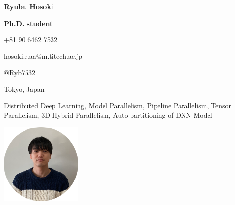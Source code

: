 \documentclass[10pt]{article}
\begin{document}
\setcounter{secnumdepth}{0}
\setlength{\parindent}{0pt}
\setlength{\baselineskip}{12pt}
\pagestyle{empty}

\begin{minipage}[h]{11cm}
  {\huge\sf\textbf{Ryubu Hosoki}\par}
  \vspace{2mm}
  {\large\sf\textbf{Ph.D. student}\par}
  \vspace{2mm}
  \begin{minipage}[t]{6cm}
    \begin{description}[align=left,leftmargin=1.5cm,style=multiline]
      \setlength{\itemsep}{0pt}
      \item [Phone] +81 90 6462 7532
      \item [Email] hosoki.r.aa@m.titech.ac.jp
    \end{description}
  \end{minipage}
  \begin{minipage}[t]{5cm}
    \begin{description}[align=left,leftmargin=1.8cm,style=multiline]
      \setlength{\itemsep}{0pt}
      \item [Github] \href{https://github.com/Ryb7532}{@Ryb7532}
      \item [Address] Tokyo, Japan
    \end{description}
  \end{minipage}
  \begin{description}[align=left,leftmargin=2cm,style=multiline]
    \setlength{\itemsep}{0pt}
    \item [Research Interests] Distributed Deep Learning, Model Parallelism, Pipeline Parallelism, Tensor Parallelism, 3D Hybrid Parallelism, Auto-partitioning of DNN Model
  \end{description}
\end{minipage}
\begin{minipage}[h]{5.5cm}
  \raggedleft
  \includegraphics[width=4cm]{./images/icon.png}
\end{minipage}
\end{document}
